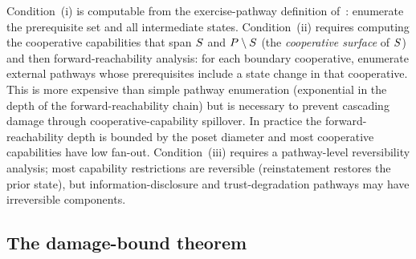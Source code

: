 \begin{remark}
\label{rem:constructibility}
Condition~(i) is computable from the exercise-pathway definition
of~\citep[Definition~2]{lasser2026horizon}: enumerate the
prerequisite set and all intermediate states.  Condition~(ii)
requires computing the cooperative capabilities that span
$S$ and $P \setminus S$ (the \emph{cooperative
surface} of $S$) and then forward-reachability analysis:
for each boundary cooperative, enumerate external pathways whose
prerequisites include a state change in that cooperative.  This
is more expensive than simple pathway enumeration (exponential
in the depth of the forward-reachability chain) but is necessary
to prevent cascading damage through cooperative-capability
spillover.  In practice the forward-reachability depth is
bounded by the poset diameter and most cooperative capabilities
have low fan-out.  Condition~(iii) requires a pathway-level
reversibility analysis; most capability restrictions are
reversible (reinstatement restores the prior state), but
information-disclosure and trust-degradation pathways may have
irreversible components.
\end{remark}

\subsection{The damage-bound theorem}


